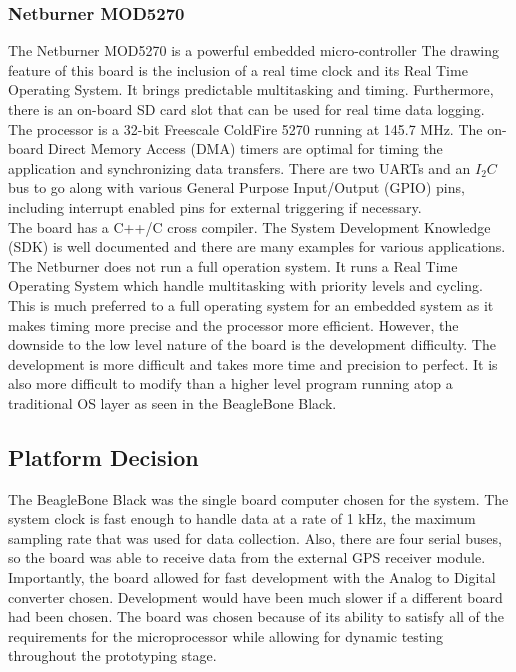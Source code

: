 \subsubsection{Netburner MOD5270}
\label{subsec:MOD5270}
\indent The Netburner MOD5270 is a powerful embedded
micro-controller The drawing feature of this board is the inclusion
of a real time clock and its Real Time Operating System. It brings
predictable multitasking and timing. Furthermore, there is an
on-board SD card slot that can be used for real time data
logging. The processor is a 32-bit Freescale ColdFire 5270
running at 145.7 MHz. The on-board Direct Memory Access (DMA)
timers are optimal for timing the application and
synchronizing data transfers. There are two UARTs and an
$I_2C$ bus to go along with various General Purpose
Input/Output (GPIO) pins, including interrupt enabled pins
for external triggering if necessary. \\

\indent The board has a C++/C cross compiler. The System Development
Knowledge (SDK) is well documented and there are many examples for
various applications. The Netburner does not run a full operation
system. It runs a Real Time Operating System which
handle multitasking with priority levels and cycling. This is
much preferred to a full operating system for an embedded system
as it makes timing more precise and the processor more
efficient. However, the downside to the low level nature of
the board is the development difficulty. The development is
more difficult and takes more time and precision to
perfect. It is also more difficult to modify than a higher
level program running atop a traditional OS layer as seen
in the BeagleBone Black.

\subsection{Platform Decision}

The BeagleBone Black was the single board computer chosen for the
system. The system clock is fast enough to handle data at a rate of
1 kHz, the maximum sampling rate that was used for data
collection. Also, there are four serial buses, so the board was
able to receive data from the external GPS receiver module.
Importantly, the board allowed for fast development with the
Analog to Digital converter chosen. Development would have
been much slower if a different board had been chosen. The
board was chosen because of its ability to satisfy all of the
requirements for the microprocessor while allowing for
dynamic testing throughout the prototyping stage. 
